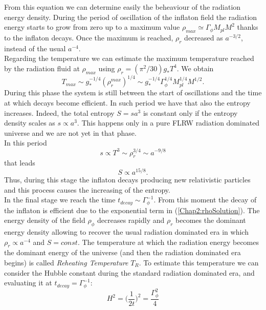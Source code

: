 \documentclass[11pt,a4paper,twoside]{book}
\begin{document}
From this equation we can determine easily the beheaviour of the radiation energy density. During the period of oscillation of the inflaton field the radiation energy starts to grow from zero up to a maximum value $\rho_{max} \simeq \Gamma_{\phi} M_{pl} M^{2}$ thanks to the inflaton decays. Once the maximum is reached, $\rho_{r}$ decreased as $ a^{-3/2} $, instead of the usual $ a^{-4} $.\\
Regarding the temperature we can estimate the maximum temperature reached by the radiation fluid at $\rho_{max}$ using $ \rho_{r}=(\pi^{2}/30)g_{*}T^{4} $. We obtain 
\begin{equation}
	T_{max} \sim g_{*}^{-1/4}(\rho_{r}^{max})^{1/4} \sim g_{*}^{-1/4}\Gamma_{\phi}^{1/4}M_{pl}^{1/4}M^{1/2}.
\end{equation}
During this phase the system  is still between the start of oscillations and the time at which decays become efficient. In such period we have that also the entropy increases. Indeed, the total entropy $ S = sa^{3} $ is constant only if the entropy density scales as $ s \propto a^{3} $. This happens only in a pure FLRW radiation dominated universe and we are not yet in that phase.\\
In this period 
\begin{equation}
\label{Chap2:entropy}
s \propto T^{3} \sim \rho_{r}^{3/4} \sim a^{-9/8}
\end{equation}
that leads
\begin{equation}
	\label{Chap2:totalEntropy}
	S \propto a^{15/8}.
\end{equation}
Thus, during this stage the inflaton decays producing new relativistic particles and this process causes the increasing of the entropy.\\
In the final stage we reach the time $ t_{decay} \sim \Gamma^{-1}_{\phi} $. From this moment the decay of the inflaton is efficient due to the exponential term in (\ref{Chap2:rhoSolution}). The energy density of the field $\rho_{\phi}$ decreases rapidly and $\rho_{r}$ becomes the dominant energy density allowing to recover the usual radiation dominated era in which $ \rho_{r} \propto a^{-4} $ and $ S=const $. The temperature at which the radiation energy becomes the dominant energy of the universe (and then the radiation dominated era begins) is called \textit{Reheating Temperature} $ T_{R} $. To estimate this temperature we can consider the Hubble constant during the standard radiation dominated era, and evaluating it at $ t_{decay}=\Gamma_{\phi}^{-1} $:
\begin{equation}
	\label{HubbleConstant}
	H^{2} = \Big (\frac{1}{2t}\Big)^{2} = \frac{\Gamma_{\phi}^{2}}{4} 
\end{equation}
\end{document}
